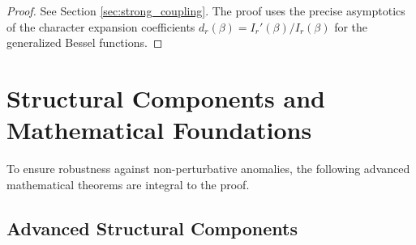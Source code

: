\begin{proof}
See Section \ref{sec:strong_coupling}. The proof uses the precise asymptotics of the character expansion coefficients $d_r(\beta) = I_r'(\beta)/I_r(\beta)$ for the generalized Bessel functions.
\end{proof}

\section[Structural Components and Mathematical Foundations]{Structural Components and \\ Mathematical Foundations}

To ensure robustness against non-perturbative anomalies, the following advanced mathematical theorems are integral to the proof.

\subsection{Advanced Structural Components}

